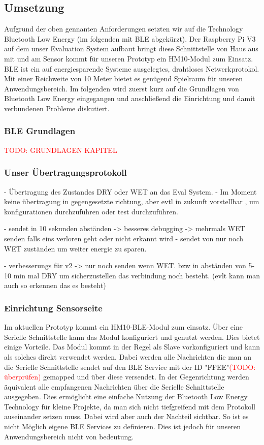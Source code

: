 \subsection{Umsetzung}
Aufgrund der oben gennanten Anforderungen setzten wir auf die Technology Bluetooth Low Energy (im folgenden mit BLE abgekürzt). Der Raspberry Pi V3 auf dem unser Evaluation System aufbaut bringt diese Schnittstelle von Haus aus mit und am Sensor kommt für unseren Prototyp ein HM10-Modul zum Einsatz. BLE ist ein auf energiesparende Systeme ausgelegtes, drahtloses Netwerkprotokol. Mit einer Reichweite von 10 Meter \cite{ble_spec} bietet es genügend Spielraum für unseren Anwendungsbereich. Im folgenden wird zuerst kurz auf die Grundlagen von Bluetooth Low Energy eingegangen und anschließend die Einrichtung und damit verbundenen Probleme diskutiert. 

\subsubsection{BLE Grundlagen}
\textcolor{red}{TODO: GRUNDLAGEN KAPITEL}

\subsubsection{Unser Übertragungsprotokoll}
\label{subsubsec:unser_protokoll}
- Übertragung des Zustandes DRY oder WET an das Eval System.
- Im Moment keine übertragung in gegengesetzte richtung, aber evtl in zukunft vorstellbar ,
um konfigurationen durchzuführen oder test durchzuführen. 

- sendet in 10 sekunden abständen -> besseres debugging
 -> mehrmals WET senden falls eins verloren geht oder nicht erkannt wird
- sendet von nur noch WET zuständen um weiter energie zu sparen.

- verbesserungs für v2 -> nur noch senden wenn WET. 
 bzw in abständen von 5-10 min mal DRY um sicherzustellen das verbindung noch besteht. 
 (evlt kann man auch so erkennen das es besteht)


\subsubsection{Einrichtung Sensorseite}
Im aktuellen Prototyp kommt ein HM10-BLE-Modul zum einsatz. Über eine Serielle Schnittstelle kann das Modul konfiguriert und genutzt werden. Dies bietet einige Vorteile. Das Modul kommt in der Regel als Slave vorkonfiguriert und kann als solches direkt verwendet werden. Dabei werden alle Nachrichten die man an die Serielle Schnittstelle sendet auf den BLE Service mit der ID "FFEE"\textcolor{red}{(TODO: überprüfen)} gemapped und über diese versendet. In der Gegenrichtung werden äquivalent alle empfangenen Nachrichten über die Serielle Schnittstelle ausgegeben. Dies ermöglicht eine einfache Nutzung der Bluetooth Low Energy Technology für kleine Projekte, da man sich nicht tiefgreifend mit dem Protokoll auseinander setzen muss. Dabei wird aber auch der Nachteil sichtbar. So ist es nicht Möglich eigene BLE Services zu definieren. Dies ist jedoch für unseren Anwendungsbereich nicht von bedeutung. 

